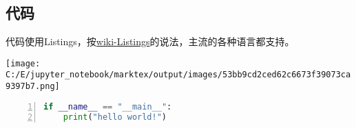 \documentclass[UTF8]{ctexart}
\newenvironment{marktext}{}{}
\begin{document}
\begin{marktext}


\subsection{代码}


代码使用Listings，按\href{https://en.wikibooks.org/wiki/LaTeX/Source_Code_Listings}{wiki{-}Listings}的说法，主流的各种语言都支持。
\begin{center}
\begin{marktext}
\vspace{\baselineskip}\texttt{[image: C:/E/jupyter\_notebook/marktex/output/images/53bb9cd2ced62c6673f39073ca9397b7.png]}\vspace{\baselineskip}
\end{marktext}
\end{center}
\end{marktext}
\begin{lstlisting}[language={Python},keywordstyle=\color{blue!70},frame=shadowbox,showstringspaces=false,commentstyle=\color{red!50!green!50!blue!50},escapeinside=``,numbers=left,numberstyle=\small,basicstyle=\small]
if __name__ == "__main__":
	print("hello world!")
\end{lstlisting}
\end{document}

